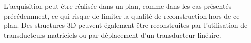 
L'acquisition peut être réalisée dans un plan, comme dans les cas présentés précédemment, ce qui risque de limiter la qualité de reconstruction hors de ce plan. Des structures 3D peuvent également être reconstruites par l'utilisation de transducteurs matriciels ou par déplacement d'un transducteur linéaire.




%
%
%




